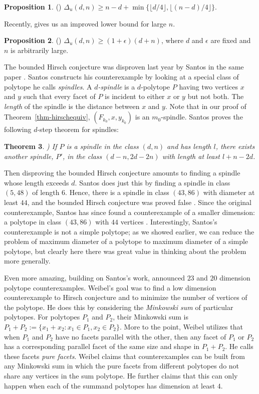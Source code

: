 \documentclass[11pt,a4paper]{article}
\newtheorem{thm}{Theorem}[section]
\theoremstyle{definition}
\newtheorem{prop}[thm]{Proposition}
\begin{document}
\begin{prop}
(\citet{klee67}) $\Delta_u(d,n)\ge n-d+\min\{\lfloor d/4\rfloor,\lfloor(n-d)/4\rfloor\}$.
\end{prop}
Recently, \citet{santos10} gives us an improved lower bound for large $n$.
\begin{prop}
(\citet{santos10}) $\Delta_u(d,n)\ge (1+\epsilon)(d+n)$, where $d$ and $\epsilon$ are fixed and $n$ is arbitrarily large.
\end{prop}
The bounded Hirsch conjecture was disproven last year by Santos in the same paper \citep{santos10}. Santos constructs his counterexample by looking at a special class of polytope he calls \emph{spindles}. A \emph{$d$-spindle} is a $d$-polytope $P$ having two vertices $x$ and $y$ such that every facet of $P$ is incident to either $x$ or $y$ but not both. The \emph{length} of the spindle is the distance between $x$ and $y$. Note that in our proof of Theorem~\ref{thm-hirschequiv}, $(F_{k_0},x,y_{k_0})$ is an $m_0$-spindle. Santos proves the following $d$-step theorem for spindles:
\begin{thm}
{\rm \citet{santos10})} If $P$ is a spindle in the class $(d,n)$ and has length $l$, there exists another spindle, $P'$, in the class $(d-n,2d-2n)$ with length at least $l+n-2d$.
\end{thm}
Then disproving the bounded Hirsch conjecture amounts to finding a spindle whose length exceeds $d$. Santos does just this by finding a spindle in class $(5,48)$ of length 6. Hence, there is a spindle in class $(43,86)$ with diameter at least $44$, and the bounded Hirsch conjecture was proved false \citep{santos10}. Since the original counterexample, Santos has since found a counterexample of a smaller dimension: a polytope in class $(43,86)$ with $44$ vertices \citep{santos-slides}. Interestingly, Santos's counterexample is not a simple polytope; as we showed earlier, we can reduce the problem of maximum diameter of a polytope to maximum diameter of a simple polytope, but clearly here there was great value in thinking about the problem more generally.

Even more amazing, building on Santos's work, \citet{weib11} announced $23$ and $20$ dimension polytope counterexamples. Weibel's goal was to find a low dimension counterexample to Hirsch conjecture and to minimize the number of vertices of the polytope. He does this by considering the \emph{Minkowski sum} of particular polytopes. For polytopes $P_1$ and $P_2$, their Minkowski sum is $P_1+P_2:=\{x_1+x_2 : x_1\in P_1, x_2\in P_2\}$. More to the point, Weibel utilizes that when $P_1$ and $P_2$ have no facets parallel with the other, then any facet of $P_1$ or $P_2$ has a corresponding parallel facet of the same size and shape in $P_1+P_2$. He calls these facets \emph{pure facets}. Weibel claims that counterexamples can be built from any Minkowski sum in which the pure facets from different polytopes do not share any vertices in the sum polytope. He further claims that this can only happen when each of the summand polytopes has dimension at least $4$. 
\end{document}
